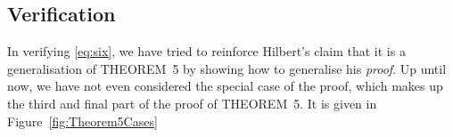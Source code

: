 
\subsection{Verification}
In verifying \ref{eq:six}, we have tried to reinforce Hilbert's claim that it is a generalisation of THEOREM~5 by showing how to generalise his \emph{proof}. Up until now, we have not even considered the special case of the proof, which makes up the third and final part of the proof of THEOREM~5. It is given in Figure~\ref{fig:Theorem5Cases}

